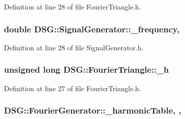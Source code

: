 Definition at line 28 of file Fourier\+Triangle.\+h.

\hypertarget{classDSG_1_1SignalGenerator_a67e296e3506dcdf09402c667cddff9ac}{
\subsubsection[{\+\_\+frequency}]{\setlength{\rightskip}{0pt plus 5cm}double D\+S\+G\+::\+Signal\+Generator\+::\+\_\+frequency\hspace{0.3cm}{\ttfamily [protected]}, {\ttfamily [inherited]}}}\label{classDSG_1_1SignalGenerator_a67e296e3506dcdf09402c667cddff9ac}


Definition at line 28 of file Signal\+Generator.\+h.

\hypertarget{classDSG_1_1FourierTriangle_a855d5d0d221588639f079f463cd2141d}{
\subsubsection[{\+\_\+h}]{\setlength{\rightskip}{0pt plus 5cm}unsigned long D\+S\+G\+::\+Fourier\+Triangle\+::\+\_\+h\hspace{0.3cm}{\ttfamily [protected]}}}\label{classDSG_1_1FourierTriangle_a855d5d0d221588639f079f463cd2141d}


Definition at line 27 of file Fourier\+Triangle.\+h.

\hypertarget{classDSG_1_1FourierGenerator_a7288408f8e44d5edb5eecc62480243d7}{
\subsubsection[{\+\_\+harmonic\+Table}]{ D\+S\+G\+::\+Fourier\+Generator\+::\+\_\+harmonic\+Table\hspace{0.3cm}{\ttfamily [static]}, {\ttfamily [protected]}, {\ttfamily [inherited]}}}\label{classDSG_1_1FourierGenerator_a7288408f8e44d5edb5eecc62480243d7}


